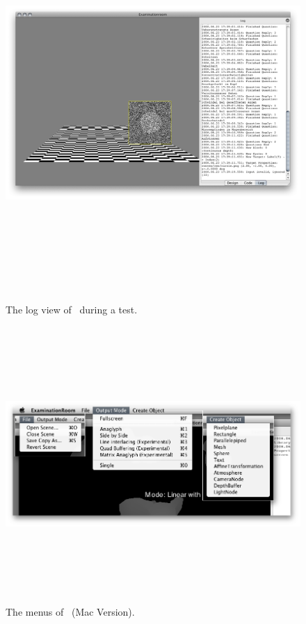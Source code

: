 \begin{figure}
\begin{center}
\includegraphics[height=15cm]{screenshots/er_log_screenshot.png}
\caption{The log view of \ER\ during a test.\label{ssLog}}
\end{center}
\end{figure}

\begin{figure}
\begin{center}
\includegraphics[height=10.5cm]{screenshots/er_menus.png}
\caption{The menus of \ER\ (Mac Version).\label{ssMenu}}
\end{center}
\end{figure}

\clearpage

